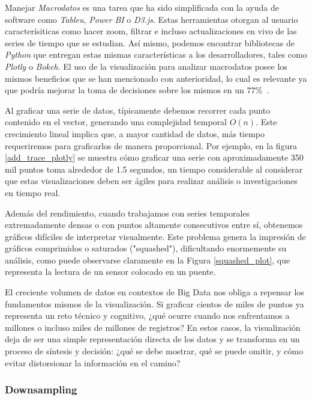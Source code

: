 Manejar \textit{Macrodatos} es una tarea que ha sido simplificada con la ayuda de software como \textit{Tableu}, \textit{Power BI} o \textit{D3.js}. Estas herramientas otorgan al usuario caracterísiticas como hacer zoom, filtrar e incluso actualizaciones en vivo de las series de tiempo que se estudian. Así mismo, podemos encontrar bibliotecas de \textit{Python} que entregan estas mismas características a los desarrolladores, tales como \textit{Plotly} o \textit{Bokeh}. El uso de la visualización para analizar macrodatos posee los mismos beneficios que se han mencionado con anterioridad, lo cual es relevante ya que podría mejorar la toma de decisiones sobre los mismos en un $77\%$~\cite{ali2016bigdata}.

Al graficar una serie de datos, típicamente debemos recorrer cada punto contenido en el vector, generando una complejidad temporal $O(n)$. Este crecimiento lineal implica que, a mayor cantidad de datos, más tiempo requeriremos para graficarlos de manera proporcional. Por ejemplo, en la figura \ref{add_trace_plotly} se muestra cómo graficar una serie con aproximadamente 350 mil puntos toma alrededor de 1.5 segundos, un tiempo considerable al considerar que estas visualizaciones deben ser ágiles para realizar análisis o investigaciones en tiempo real.

Además del rendimiento, cuando trabajamos con series temporales extremadamente densas o con puntos altamente consecutivos entre sí, obtenemos gráficos difíciles de interpretar visualmente. Este problema genera la impresión de gráficos comprimidos o saturados ("squashed"), dificultando enormemente su análisis, como puede observarse claramente en la Figura \ref{squashed_plot}, que representa la lectura de un sensor colocado en un puente.

El creciente volumen de datos en contextos de Big Data nos obliga a repensar los fundamentos mismos de la visualización. Si graficar cientos de miles de puntos ya representa un reto técnico y cognitivo, ¿qué ocurre cuando nos enfrentamos a millones o incluso miles de millones de registros? En estos casos, la visualización deja de ser una simple representación directa de los datos y se transforma en un proceso de síntesis y decisión: ¿qué se debe mostrar, qué se puede omitir, y cómo evitar distorsionar la información en el camino?

\subsubsection{Downsampling}

